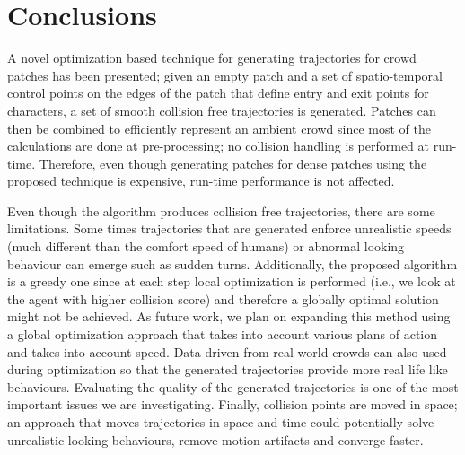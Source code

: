 \section{Conclusions}
\label{sec:conclusions}

A novel optimization based technique for generating trajectories for crowd patches has been presented;
given an empty patch and a set of spatio-temporal control points on the edges of the patch that define entry and exit points for characters, a set of smooth collision free trajectories is generated.
Patches can then be combined to efficiently represent an ambient crowd since most of the calculations are done at pre-processing; no collision handling is performed at run-time.
Therefore, even though generating patches for dense patches using the proposed technique is expensive, run-time performance is not affected.

Even though the algorithm produces collision free trajectories, there are some limitations.
Some times trajectories that are generated enforce unrealistic speeds (much different than the comfort speed of humans) or abnormal looking behaviour can emerge such  as sudden turns.
Additionally, the proposed algorithm is a greedy one since at each step local optimization is performed (i.e., we look at the agent with higher collision score) and therefore a globally optimal solution might not be achieved.
As future work, we plan on expanding this method using a global optimization approach that takes into account various plans of action and takes into account speed.
Data-driven from real-world crowds can also used during optimization so that the generated trajectories provide more real life like behaviours.
Evaluating the quality of the generated trajectories is one of the most important issues we are investigating.
Finally, collision points are moved in space; an approach that moves trajectories in space and time could potentially solve unrealistic looking behaviours, remove motion artifacts and converge faster.

